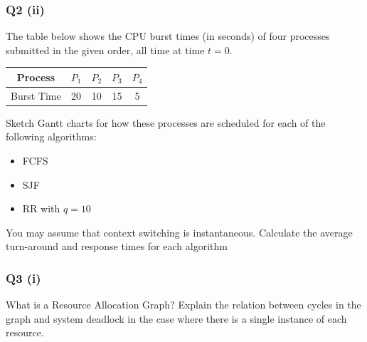 \documentclass[a4paper, 10pt]{article}
\begin{document}
\subsubsection*{Q2 (ii)}
The table below shows the CPU burst times (in seconds) of four processes submitted in the given order, all time at time $t = 0$.
\begin{center}
    \begin{tabular}{c|c|c|c|c}
        Process    & $P_1$ & $P_2$ & $P_3$ & $P_4$ \\
        \hline
        Burst Time & 20    & 10    & 15    & 5     \\
    \end{tabular}
\end{center}
Sketch Gantt charts for how these processes are scheduled for each of the
following algorithms:
\begin{itemize}
    \item FCFS
    \item SJF
    \item RR with $q = 10$
\end{itemize}
You may assume that context switching is instantaneous. Calculate the average turn-around and response times for each algorithm
\subsubsection*{Q3 (i)}
What is a Resource Allocation Graph? Explain the relation between cycles in the graph and system deadlock in the case where there is a single instance of each resource.
\end{document}
